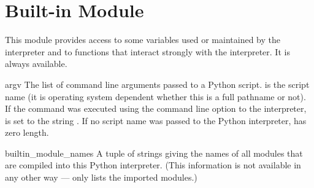 \section{Built-in Module }
\label{module-sys}

This module provides access to some variables used or maintained by the
interpreter and to functions that interact strongly with the interpreter.
It is always available.

\renewcommand{\indexsubitem}{(in module sys)}

\begin{datadesc}{argv}
  The list of command line arguments passed to a Python script.
   is the script name (it is operating system
  dependent whether this is a full pathname or not).
  If the command was executed using the  command line option
  to the interpreter,  is set to the string
  .
  If no script name was passed to the Python interpreter,
   has zero length.
\end{datadesc}

\begin{datadesc}{builtin_module_names}
  A tuple of strings giving the names of all modules that are compiled
  into this Python interpreter.  (This information is not available in
  any other way ---  only lists the imported
  modules.)
\end{datadesc}

